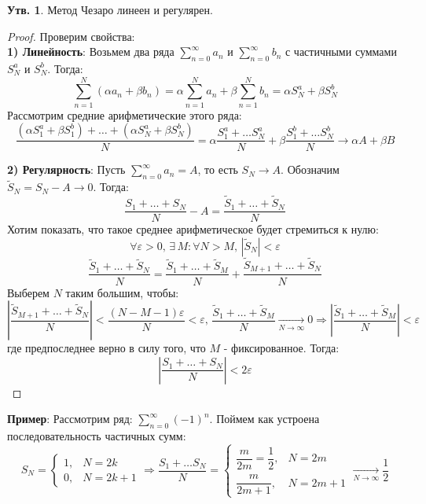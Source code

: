 \documentclass[12pt]{article}
\newcommand{\VE}{\varepsilon}
\theoremstyle{definition}
\newtheorem{prop}{Утв.}
\newcommand{\ddsum}[2]{\displaystyle\sum\limits_{#1}^{#2}}
\newcommand{\wte}[1]{\widetilde{#1}}
\begin{document}
\begin{prop}
	Метод Чезаро линеен и регулярен.
\end{prop}
\begin{proof} Проверим свойства:\\
	\textbf{1) Линейность}: Возьмем два ряда $\ddsum{n = 0}{\infty}a_n$ и $\ddsum{n = 0}{\infty}b_n$ с частичными суммами $S_N^a$ и $S_N^b$. Тогда:
	$$
		\ddsum{n = 1}{N}\left(\alpha a_n + \beta b_n\right) = \alpha \ddsum{n = 1}{N}a_n + \beta \ddsum{n = 1}{N} b_n = \alpha S_N^a + \beta S_N^b
	$$
	Рассмотрим средние арифметические этого ряда:
	$$
		\dfrac{(\alpha S_1^a + \beta S_1^b) + \dotsc + (\alpha S_N^a + \beta S_N^b)}{N} = \alpha \dfrac{S_1^a + \dotsc S_N^a}{N} + \beta \dfrac{S_1^b + \dotsc S_N^b}{N} \to \alpha A + \beta B
	$$
	
	\textbf{2) Регулярность}: Пусть $\ddsum{n = 0}{\infty}a_n = A$, то есть $S_N \to A$. Обозначим $\wte{S}_N = S_N - A \to 0$. Тогда:
	$$
		\dfrac{S_1 + \dotsc + S_N}{N} - A = \dfrac{\wte{S}_1 + \dotsc + \wte{S}_N}{N}
	$$
	Хотим показать, что такое среднее арифметическое будет стремиться к нулю:
	$$
		\forall \VE > 0, \, \exists \, M \colon \forall N > M, \, \left|\wte{S}_N\right| < \VE
	$$
	$$
		\dfrac{\wte{S}_1 + \dotsc + \wte{S}_N}{N} = \dfrac{\wte{S}_1 + \dotsc + \wte{S}_M}{N} + \dfrac{\wte{S}_{M+1} + \dotsc + \wte{S}_N}{N}
	$$
	Выберем $N$ таким большим, чтобы:
	$$
		\left|\dfrac{\wte{S}_{M+1} + \dotsc + \wte{S}_N}{N}\right| < \dfrac{(N - M - 1)\VE}{N} < \VE, \, \dfrac{\wte{S}_1 + \dotsc + \wte{S}_M}{N} \xrightarrow[N \to \infty]{} 0 \Rightarrow \left|\dfrac{\wte{S}_1 + \dotsc + \wte{S}_M}{N}\right| < \VE
	$$
	где предпоследнее верно в силу того, что $M$ - фиксированное. Тогда:
	$$
		\left|\dfrac{S_1 + \dotsc + S_N}{N}\right| < 2\VE
	$$
\end{proof}

\textbf{Пример}: Рассмотрим ряд: $\ddsum{n = 0}{\infty}(-1)^n$. Поймем как устроена последовательность частичных сумм:
$$
	S_N = 
	\begin{cases}
		1, & N = 2k\\
		0, & N = 2k + 1
	\end{cases} \Rightarrow 
	\dfrac{S_1 + \dotsc S_N}{N} = 
	\begin{cases}
		\dfrac{m}{2m} = \dfrac{1}{2}, & N = 2m\\[15pt]
		\dfrac{m}{2m + 1}, & N = 2m + 1
	\end{cases} \xrightarrow[N \to \infty]{} \dfrac{1}{2}
$$
\end{document}
